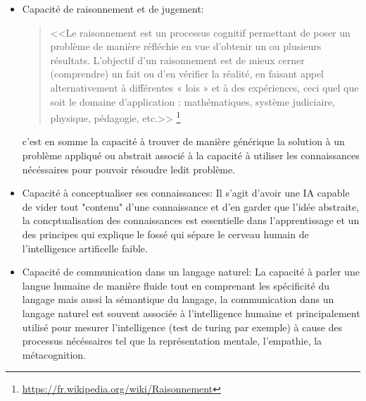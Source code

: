 \begin{itemize}
    \item Capacité de raisonnement et de jugement: 
    \begin{quotation}
    <<Le raisonnement est un processus cognitif permettant 
    de poser un problème de manière réfléchie en vue d'obtenir un ou plusieurs résultats. 
    L'objectif d'un raisonnement est de mieux cerner (comprendre) un fait ou d'en vérifier la réalité, 
    en faisant appel alternativement à différentes « lois » et à des expériences, 
    ceci quel que soit le domaine d'application : mathématiques, système judiciaire, 
    physique, pédagogie, etc.>>
    \footnote{\url{https://fr.wikipedia.org/wiki/Raisonnement}}  
    \end{quotation}

    c'est en somme la capacité à trouver de manière générique la solution à un problème appliqué 
    ou abstrait associé à la capacité à utiliser les connaissances nécéssaires pour pouvoir
    résoudre ledit problème. 
    \newline

    \item Capacité à conceptualiser ses connaissances: \newline
    Il s'agit d'avoir une IA capable de vider tout "contenu" d'une connaissance et d'en garder 
    que l'idée abstraite, la concptualisation des connaissances est essentielle dans l'apprentissage
    et un des principes qui explique le fossé qui sépare le cerveau humain de l'intelligence 
    artificelle faible. %
    \newline
    

    \item Capacité de communication dans un langage naturel: \newline
    La capacité à parler une langue humaine de manière fluide 
    tout en comprenant les spécificité du langage mais aussi la sémantique du langage,
    la communication dans un langage naturel est souvent associée à l'intelligence humaine 
    et principalement utilisé pour mesurer l'intelligence (test de turing par exemple)
    à cause des processus nécéssaires tel que la représentation mentale, l'empathie, 
    la métacognition. 
    \newline
    


\end{itemize}
